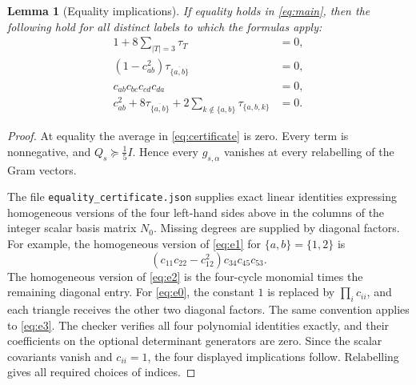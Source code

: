 \documentclass[11pt,a4paper]{article}
\newtheorem{lemma}[theorem]{Lemma}
\theoremstyle{remark}\newtheorem{remark}[theorem]{Remark}
\begin{document}
\begin{lemma}[Equality implications]\label{lem:equality}
If equality holds in \eqref{eq:main}, then the following hold for all distinct labels to which the formulas apply:
\begin{align}
 1+8\sum_{|T|=3}\tau_T&=0,\label{eq:e0}\\
 (1-c_{ab}^2)\tau_{\overline{\{a,b\}}}&=0,\label{eq:e1}\\
 c_{ab}c_{bc}c_{cd}c_{da}&=0,\label{eq:e2}\\
 c_{ab}^2+8\tau_{\overline{\{a,b\}}}
       +2\sum_{k\notin\{a,b\}}\tau_{\{a,b,k\}}&=0.\label{eq:e3}
\end{align}
\end{lemma}
\begin{proof}
At equality the average in \eqref{eq:certificate} is zero. Every term is nonnegative, and $Q_s\succeq\tfrac15I$. Hence every $g_{s,\alpha}$ vanishes at every relabelling of the Gram vectors.

The file \nolinkurl{equality_certificate.json} supplies exact linear identities expressing homogeneous versions of the four left-hand sides above in the columns of the integer scalar basis matrix $N_0$. Missing degrees are supplied by diagonal factors. For example, the homogeneous version of \eqref{eq:e1} for $\{a,b\}=\{1,2\}$ is
\[
 (c_{11}c_{22}-c_{12}^2)c_{34}c_{45}c_{53}.
\]
The homogeneous version of \eqref{eq:e2} is the four-cycle monomial times the remaining diagonal entry. For \eqref{eq:e0}, the constant $1$ is replaced by $\prod_i c_{ii}$, and each triangle receives the other two diagonal factors. The same convention applies to \eqref{eq:e3}. The checker verifies all four polynomial identities exactly, and their coefficients on the optional determinant generators are zero. Since the scalar covariants vanish and $c_{ii}=1$, the four displayed implications follow. Relabelling gives all required choices of indices.
\end{proof}
\end{document}
